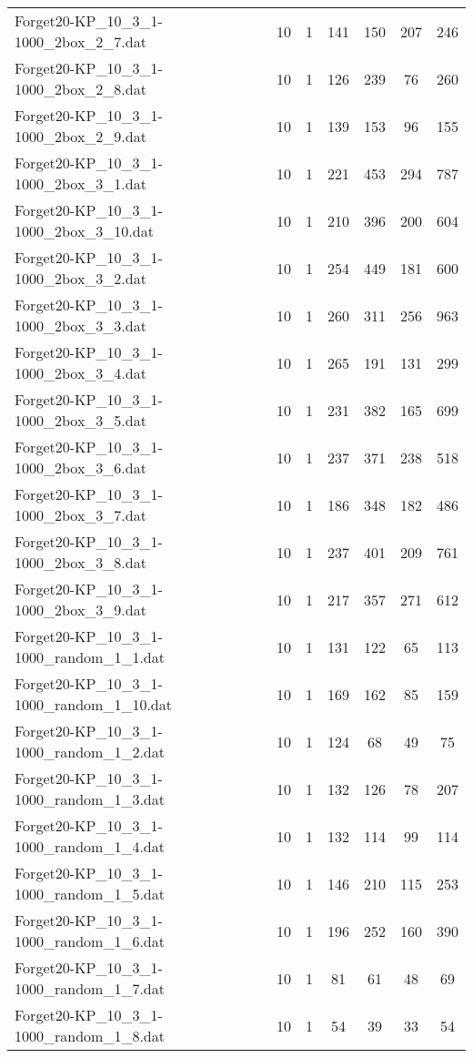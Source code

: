 \begin{table}[!ht]
\begin{tabular}{lcccccc}
Forget20-KP\_10\_3\_1-1000\_2box\_2\_7.dat & 10 & 1 & 141 & 150 & 207 & 246 \\
Forget20-KP\_10\_3\_1-1000\_2box\_2\_8.dat & 10 & 1 & 126 & 239 & 76 & 260 \\
Forget20-KP\_10\_3\_1-1000\_2box\_2\_9.dat & 10 & 1 & 139 & 153 & 96 & 155 \\
Forget20-KP\_10\_3\_1-1000\_2box\_3\_1.dat & 10 & 1 & 221 & 453 & 294 & 787 \\
Forget20-KP\_10\_3\_1-1000\_2box\_3\_10.dat & 10 & 1 & 210 & 396 & 200 & 604 \\
Forget20-KP\_10\_3\_1-1000\_2box\_3\_2.dat & 10 & 1 & 254 & 449 & 181 & 600 \\
Forget20-KP\_10\_3\_1-1000\_2box\_3\_3.dat & 10 & 1 & 260 & 311 & 256 & 963 \\
Forget20-KP\_10\_3\_1-1000\_2box\_3\_4.dat & 10 & 1 & 265 & 191 & 131 & 299 \\
Forget20-KP\_10\_3\_1-1000\_2box\_3\_5.dat & 10 & 1 & 231 & 382 & 165 & 699 \\
Forget20-KP\_10\_3\_1-1000\_2box\_3\_6.dat & 10 & 1 & 237 & 371 & 238 & 518 \\
Forget20-KP\_10\_3\_1-1000\_2box\_3\_7.dat & 10 & 1 & 186 & 348 & 182 & 486 \\
Forget20-KP\_10\_3\_1-1000\_2box\_3\_8.dat & 10 & 1 & 237 & 401 & 209 & 761 \\
Forget20-KP\_10\_3\_1-1000\_2box\_3\_9.dat & 10 & 1 & 217 & 357 & 271 & 612 \\
Forget20-KP\_10\_3\_1-1000\_random\_1\_1.dat & 10 & 1 & 131 & 122 & 65 & 113 \\
Forget20-KP\_10\_3\_1-1000\_random\_1\_10.dat & 10 & 1 & 169 & 162 & 85 & 159 \\
Forget20-KP\_10\_3\_1-1000\_random\_1\_2.dat & 10 & 1 & 124 & 68 & 49 & 75 \\
Forget20-KP\_10\_3\_1-1000\_random\_1\_3.dat & 10 & 1 & 132 & 126 & 78 & 207 \\
Forget20-KP\_10\_3\_1-1000\_random\_1\_4.dat & 10 & 1 & 132 & 114 & 99 & 114 \\
Forget20-KP\_10\_3\_1-1000\_random\_1\_5.dat & 10 & 1 & 146 & 210 & 115 & 253 \\
Forget20-KP\_10\_3\_1-1000\_random\_1\_6.dat & 10 & 1 & 196 & 252 & 160 & 390 \\
Forget20-KP\_10\_3\_1-1000\_random\_1\_7.dat & 10 & 1 & 81 & 61 & 48 & 69 \\
Forget20-KP\_10\_3\_1-1000\_random\_1\_8.dat & 10 & 1 & 54 & 39 & 33 & 54 \\

\end{tabular}
\end{table}
